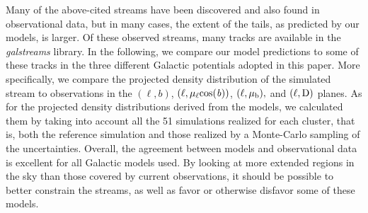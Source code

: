             Many of the above-cited streams have been discovered and also found  in observational data, but in many cases, the extent of the tails, as predicted by our models, is larger. Of these observed streams, many tracks are available in the \textit{galstreams} \citep{2023MNRAS.520.5225M} library. In the following, we compare our model predictions to some of these tracks in the three different Galactic potentials adopted in this paper. More specifically, we compare the projected density distribution of the simulated stream to observations in the $(\ell, b)$, $(\ell,  \rm \mu_{\ell}cos(\mathit{b}))$, $(\ell, \rm \mu_b),$ and $(\ell, \rm D)$ planes. As for the projected density distributions derived from the models, we calculated them by taking into account all the 51 simulations realized for each cluster, that is, both the reference simulation and those realized by a Monte-Carlo sampling of the uncertainties. Overall, the agreement between models and observational data is excellent for all Galactic models used. By looking at more extended regions in the sky than those covered by current observations, it should be possible to better constrain the streams, as well as favor or otherwise disfavor some of these models.

